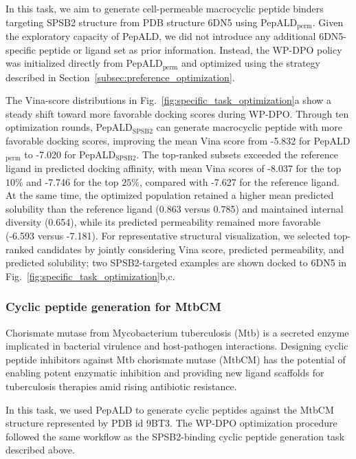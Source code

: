 In this task, we aim to generate cell-permeable macrocyclic peptide binders targeting SPSB2 structure from PDB structure 6DN5 using PepALD$_{\mathrm{perm}}$.
Given the exploratory capacity of PepALD, we did not introduce any additional 6DN5-specific peptide or ligand set as prior information.
Instead, the WP-DPO policy was initialized directly from PepALD$_{\mathrm{perm}}$ and optimized using the strategy described in Section~\ref{subsec:preference_optimization}.

The Vina-score distributions in Fig.~\ref{fig:specific_task_optimization}a show a steady shift toward more favorable docking scores during WP-DPO.
Through ten optimization rounds, PepALD$_{\mathrm{SPSB2}}$ can generate macrocyclic peptide with more favorable docking scores, improving the mean Vina score from -5.832 for PepALD$_{\mathrm{perm}}$ to -7.020 for PepALD$_{\mathrm{SPSB2}}$.
The top-ranked subsets exceeded the reference ligand in predicted docking affinity, with mean Vina scores of -8.037 for the top $10\%$ and -7.746 for the top $25\%$, compared with -7.627 for the reference ligand.
At the same time, the optimized population retained a higher mean predicted solubility than the reference ligand (0.863 versus 0.785) and maintained internal diversity (0.654), while its predicted permeability remained more favorable (-6.593 versus -7.181).
For representative structural visualization, we selected top-ranked candidates by jointly considering Vina score, predicted permeability, and predicted solubility; two SPSB2-targeted examples are shown docked to 6DN5 in Fig.~\ref{fig:specific_task_optimization}b,c.

\subsubsection{Cyclic peptide generation for MtbCM}\label{subsubsec:mtbcm_generation}

Chorismate mutase from Mycobacterium tuberculosis (Mtb) is a secreted enzyme implicated in bacterial virulence and host-pathogen interactions. 
Designing cyclic peptide inhibitors against Mtb chorismate mutase (MtbCM) has the potential of enabling potent enzymatic inhibition and providing new ligand scaffolds for tuberculosis therapies amid rising antibiotic resistance.

In this task, we used PepALD to generate cyclic peptides against the MtbCM structure represented by PDB id 9BT3. The WP-DPO optimization procedure followed the same workflow as the SPSB2-binding cyclic peptide generation task described above.

